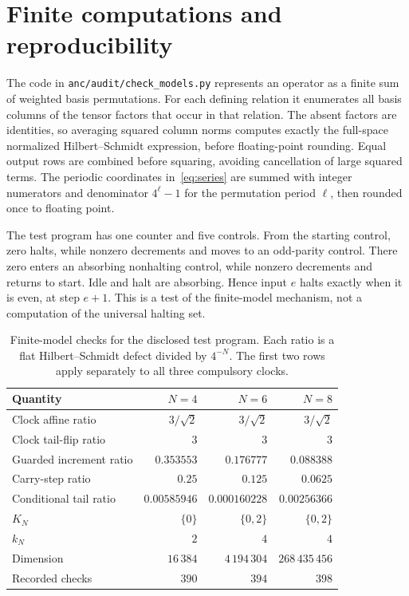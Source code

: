\section{Finite computations and reproducibility}\label{app:checks}
The code in \texttt{anc/audit/check\_models.py} represents an operator as a finite sum of weighted basis permutations. For each defining relation it enumerates all basis columns of the tensor factors that occur in that relation. The absent factors are identities, so averaging squared column norms computes exactly the full-space normalized Hilbert--Schmidt expression, before floating-point rounding. Equal output rows are combined before squaring, avoiding cancellation of large squared terms. The periodic coordinates in~\eqref{eq:series} are summed with integer numerators and denominator $4^\ell-1$ for the permutation period $\ell$, then rounded once to floating point.

The test program has one counter and five controls. From the starting control, zero halts, while nonzero decrements and moves to an odd-parity control. There zero enters an absorbing nonhalting control, while nonzero decrements and returns to start. Idle and halt are absorbing. Hence input $e$ halts exactly when it is even, at step $e+1$. This is a test of the finite-model mechanism, not a computation of the universal halting set.

\begin{table}[ht]
\centering
\caption{Finite-model checks for the disclosed test program. Each ratio is a flat Hilbert--Schmidt defect divided by $4^{-N}$. The first two rows apply separately to all three compulsory clocks.}\label{tab:checks}
\small
\begin{tabular}{lrrr}
\toprule
Quantity & $N=4$ & $N=6$ & $N=8$\\
\midrule
Clock affine ratio & $3/\sqrt2$ & $3/\sqrt2$ & $3/\sqrt2$\\
Clock tail-flip ratio & $3$ & $3$ & $3$\\
Guarded increment ratio & $0.353553$ & $0.176777$ & $0.088388$\\
Carry-step ratio & $0.25$ & $0.125$ & $0.0625$\\
Conditional tail ratio & $0.00585946$ & $0.000160228$ & $0.00256366$\\
\midrule
$K_N$ & $\{0\}$ & $\{0,2\}$ & $\{0,2\}$\\
$k_N$ & $2$ & $4$ & $4$\\
Dimension & $16\,384$ & $4\,194\,304$ & $268\,435\,456$\\
Recorded checks & $390$ & $394$ & $398$\\
\bottomrule
\end{tabular}
\end{table}

